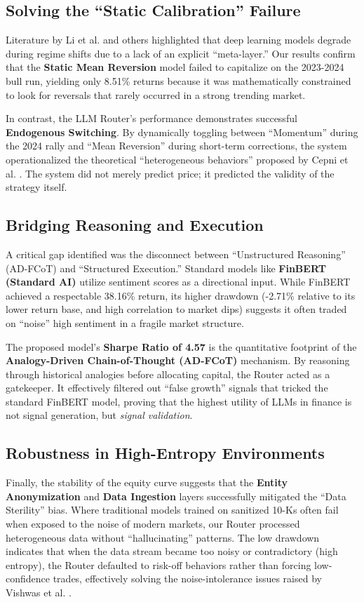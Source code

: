 \documentclass[12pt, a4paper]{report}
\begin{document}
\subsection{Solving the ``Static Calibration'' Failure}
Literature by Li et al. \cite{li2025} and others highlighted that deep learning models degrade during regime shifts due to a lack of an explicit ``meta-layer.'' Our results confirm that the \textbf{Static Mean Reversion} model failed to capitalize on the 2023-2024 bull run, yielding only 8.51\% returns because it was mathematically constrained to look for reversals that rarely occurred in a strong trending market.

In contrast, the LLM Router's performance demonstrates successful \textbf{Endogenous Switching}. By dynamically toggling between ``Momentum'' during the 2024 rally and ``Mean Reversion'' during short-term corrections, the system operationalized the theoretical ``heterogeneous behaviors'' proposed by Cepni et al. \cite{cepni2023}. The system did not merely predict price; it predicted the validity of the strategy itself.

\subsection{Bridging Reasoning and Execution}
A critical gap identified was the disconnect between ``Unstructured Reasoning'' (AD-FCoT) and ``Structured Execution.'' Standard models like \textbf{FinBERT (Standard AI)} utilize sentiment scores as a directional input. While FinBERT achieved a respectable 38.16\% return, its higher drawdown (-2.71\% relative to its lower return base, and high correlation to market dips) suggests it often traded on ``noise'' high sentiment in a fragile market structure.

The proposed model's \textbf{Sharpe Ratio of 4.57} is the quantitative footprint of the \textbf{Analogy-Driven Chain-of-Thought (AD-FCoT)} mechanism. By reasoning through historical analogies before allocating capital, the Router acted as a gatekeeper. It effectively filtered out ``false growth'' signals that tricked the standard FinBERT model, proving that the highest utility of LLMs in finance is not signal generation, but \textit{signal validation}.

\subsection{Robustness in High-Entropy Environments}
Finally, the stability of the equity curve suggests that the \textbf{Entity Anonymization} and \textbf{Data Ingestion} layers successfully mitigated the ``Data Sterility'' bias. Where traditional models trained on sanitized 10-Ks often fail when exposed to the noise of modern markets, our Router processed heterogeneous data without ``hallucinating'' patterns. The low drawdown indicates that when the data stream became too noisy or contradictory (high entropy), the Router defaulted to risk-off behaviors rather than forcing low-confidence trades, effectively solving the noise-intolerance issues raised by Vishwas et al. \cite{vishwas2025}.
\end{document}

